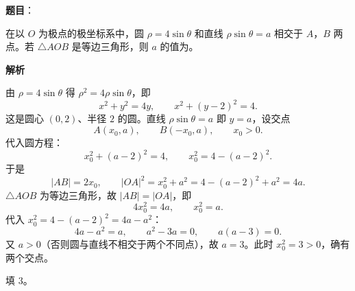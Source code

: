 \begin{answer}

\textbf{题目}：

在以 $O$ 为极点的极坐标系中，圆 $\rho=4\sin\theta$ 和直线 $\rho\sin\theta=a$ 相交于 $A$，$B$ 两点。若 $\triangle AOB$ 是等边三角形，则 $a$ 的值为\gkblank{}。

\textbf{解析}

由 $\rho=4\sin\theta$ 得 $\rho^2=4\rho\sin\theta$，即
\nopagebreak[4]
\[x^2+y^2=4y,\qquad x^2+(y-2)^2=4.\]
这是圆心 $(0,2)$、半径 $2$ 的圆。直线 $\rho\sin\theta=a$ 即 $y=a$，设交点
\nopagebreak[4]
\[A(x_0,a),\qquad B(-x_0,a),\qquad x_0>0.\]
代入圆方程：
\nopagebreak[4]
\[x_0^2+(a-2)^2=4,\qquad x_0^2=4-(a-2)^2.\]
于是
\nopagebreak[4]
\[|AB|=2x_0,\qquad |OA|^2=x_0^2+a^2=4-(a-2)^2+a^2=4a.\]
$\triangle AOB$ 为等边三角形，故 $|AB|=|OA|$，即
\nopagebreak[4]
\[4x_0^2=4a,\qquad x_0^2=a.\]
代入 $x_0^2=4-(a-2)^2=4a-a^2$：
\nopagebreak[4]
\[4a-a^2=a,\qquad a^2-3a=0,\qquad a(a-3)=0.\]
又 $a>0$（否则圆与直线不相交于两个不同点），故 $a=3$。此时 $x_0^2=3>0$，确有两个交点。

填 $3$。


\end{answer}
